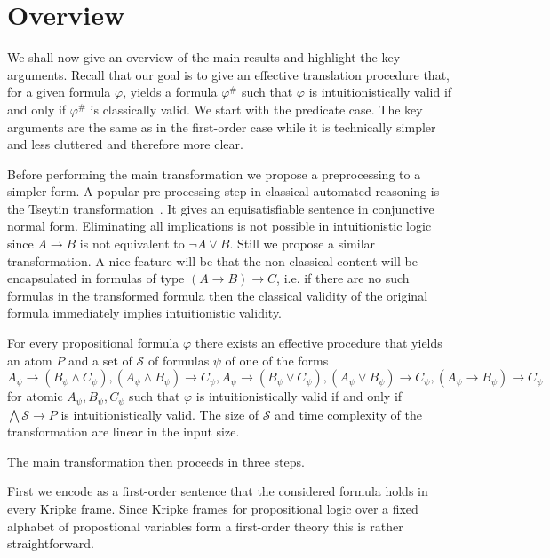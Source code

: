 \documentclass[a4paper,UKenglish,cleveref, autoref, thm-restate]{lipics-v2021}
\begin{document}
\section{Overview}

We shall now give an overview of the main results and highlight the key arguments. Recall that our goal is to give an effective translation procedure that, for a given formula $\varphi$, yields a formula $\varphi^\#$ such that $\varphi$ is intuitionistically valid if and only if $\varphi^\#$ is classically valid. We start with the predicate case. The key arguments are the same as in the first-order case while it is technically simpler and less cluttered and therefore more clear.

Before performing the main transformation we propose a preprocessing to a simpler form. A popular pre-processing step in classical automated reasoning is the Tseytin transformation~\cite{tseitin1983complexity}. It gives an equisatisfiable sentence in conjunctive normal form. Eliminating all implications is not possible in intuitionistic logic since $A\to B$ is not equivalent to $\neg A\vee B$. Still we propose a similar transformation. A nice feature will be that the non-classical content will be encapsulated in formulas of type $(A\to B)\to C$, i.e. if there are no such formulas in the transformed formula then the classical validity of the original formula immediately implies intuitionistic validity.

\begin{theorem}
	For every propositional formula $\varphi$ there exists an effective procedure that yields an atom $P$ and a set of $\mathcal S$ of formulas $\psi$ of one of the forms
	$$A_\psi\to (B_\psi\wedge C_\psi), (A_\psi\wedge B_\psi)\to C_\psi, A_\psi\to (B_\psi\vee C_\psi), (A_\psi\vee B_\psi)\to C_\psi, (A_\psi\to B_\psi)\to C_\psi$$for atomic $A_\psi, B_\psi, C_\psi$ such that $\varphi$ is intuitionistically valid if and only if $\bigwedge\mathcal S\to P$ is intuitionistically valid. The size of $\mathcal S$ and time complexity of the transformation are linear in the input size.
\end{theorem}

The main transformation then proceeds in three steps.

First we encode as a first-order sentence that the considered formula holds in every Kripke frame. Since Kripke frames for propositional logic over a fixed alphabet of propostional variables form a first-order theory this is rather straightforward.
\end{document}
